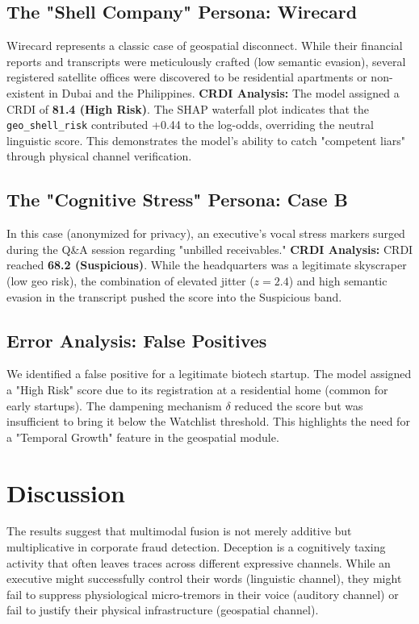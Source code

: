 \documentclass[conference]{IEEEtran}
\begin{document}
\subsection{The "Shell Company" Persona: Wirecard}
Wirecard represents a classic case of geospatial disconnect. While their financial reports and transcripts were meticulously crafted (low semantic evasion), several registered satellite offices were discovered to be residential apartments or non-existent in Dubai and the Philippines.
\textbf{CRDI Analysis:} The model assigned a CRDI of \textbf{81.4 (High Risk)}. The SHAP waterfall plot indicates that the \texttt{geo\_shell\_risk} contributed +0.44 to the log-odds, overriding the neutral linguistic score. This demonstrates the model's ability to catch "competent liars" through physical channel verification.

\subsection{The "Cognitive Stress" Persona: Case B}
In this case (anonymized for privacy), an executive's vocal stress markers surged during the Q\&A session regarding "unbilled receivables."
\textbf{CRDI Analysis:} CRDI reached \textbf{68.2 (Suspicious)}. While the headquarters was a legitimate skyscraper (low geo risk), the combination of elevated jitter ($z=2.4$) and high semantic evasion in the transcript pushed the score into the Suspicious band.

\subsection{Error Analysis: False Positives}
We identified a false positive for a legitimate biotech startup. The model assigned a "High Risk" score due to its registration at a residential home (common for early startups). The dampening mechanism $\delta$ reduced the score but was insufficient to bring it below the Watchlist threshold. This highlights the need for a "Temporal Growth" feature in the geospatial module.

\section{Discussion}

The results suggest that multimodal fusion is not merely additive but multiplicative in corporate fraud detection. Deception is a cognitively taxing activity that often leaves traces across different expressive channels. While an executive might successfully control their words (linguistic channel), they might fail to suppress physiological micro-tremors in their voice (auditory channel) or fail to justify their physical infrastructure (geospatial channel).
\end{document}
